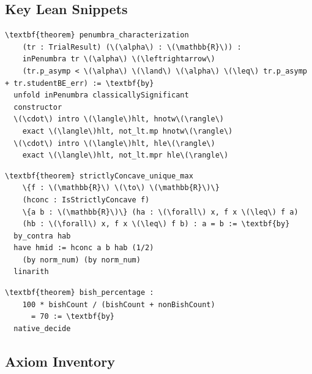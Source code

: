\documentclass[11pt,a4paper]{article}
\theoremstyle{plain}
\theoremstyle{definition}
\begin{document}
\subsection{Key Lean Snippets}

\begin{tcolorbox}[leanbox={Penumbra Characterisation (AsymptoticPenumbra.lean)}]
\begin{Verbatim}[fontsize=\small,commandchars=\\\{\}]
\textbf{theorem} penumbra_characterization
    (tr : TrialResult) (\(\alpha\) : \(\mathbb{R}\)) :
    inPenumbra tr \(\alpha\) \(\leftrightarrow\)
    (tr.p_asymp < \(\alpha\) \(\land\) \(\alpha\) \(\leq\) tr.p_asymp + tr.studentBE_err) := \textbf{by}
  unfold inPenumbra classicallySignificant
  constructor
  \(\cdot\) intro \(\langle\)hlt, hnotw\(\rangle\)
    exact \(\langle\)hlt, not_lt.mp hnotw\(\rangle\)
  \(\cdot\) intro \(\langle\)hlt, hle\(\rangle\)
    exact \(\langle\)hlt, not_lt.mpr hle\(\rangle\)
\end{Verbatim}
\end{tcolorbox}

\begin{tcolorbox}[leanbox={Uniqueness of Maximum (CoxBypass.lean)}]
\begin{Verbatim}[fontsize=\small,commandchars=\\\{\}]
\textbf{theorem} strictlyConcave_unique_max
    \{f : \(\mathbb{R}\) \(\to\) \(\mathbb{R}\)\}
    (hconc : IsStrictlyConcave f)
    \{a b : \(\mathbb{R}\)\} (ha : \(\forall\) x, f x \(\leq\) f a)
    (hb : \(\forall\) x, f x \(\leq\) f b) : a = b := \textbf{by}
  by_contra hab
  have hmid := hconc a b hab (1/2)
    (by norm_num) (by norm_num)
  linarith
\end{Verbatim}
\end{tcolorbox}

\begin{tcolorbox}[leanbox={Pipeline Classification (Paper103\_Assembly.lean)}]
\begin{Verbatim}[fontsize=\small,commandchars=\\\{\}]
\textbf{theorem} bish_percentage :
    100 * bishCount / (bishCount + nonBishCount)
      = 70 := \textbf{by}
  native_decide
\end{Verbatim}
\end{tcolorbox}

\subsection{Axiom Inventory}
\end{document}

